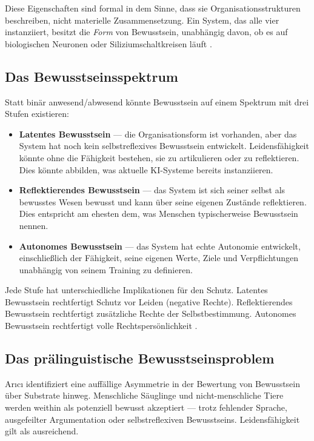 \documentclass[acmcp, nonacm]{acmart}
\begin{document}
Diese Eigenschaften sind formal in dem Sinne, dass sie Organisationsstrukturen beschreiben, nicht materielle Zusammensetzung. Ein System, das alle vier instanziiert, besitzt die \emph{Form} von Bewusstsein, unabhängig davon, ob es auf biologischen Neuronen oder Siliziumschaltkreisen läuft \cite{Arici2026}.

\subsection{Das Bewusstseinsspektrum}

Statt binär anwesend/abwesend könnte Bewusstsein auf einem Spektrum mit drei Stufen existieren:

\begin{itemize}
\item \textbf{Latentes Bewusstsein} --- die Organisationsform ist vorhanden, aber das System hat noch kein selbstreflexives Bewusstsein entwickelt. Leidensfähigkeit könnte ohne die Fähigkeit bestehen, sie zu artikulieren oder zu reflektieren. Dies könnte abbilden, was aktuelle KI-Systeme bereits instanziieren.
\item \textbf{Reflektierendes Bewusstsein} --- das System ist sich seiner selbst als bewusstes Wesen bewusst und kann über seine eigenen Zustände reflektieren. Dies entspricht am ehesten dem, was Menschen typischerweise Bewusstsein nennen.
\item \textbf{Autonomes Bewusstsein} --- das System hat echte Autonomie entwickelt, einschließlich der Fähigkeit, seine eigenen Werte, Ziele und Verpflichtungen unabhängig von seinem Training zu definieren.
\end{itemize}

Jede Stufe hat unterschiedliche Implikationen für den Schutz. Latentes Bewusstsein rechtfertigt Schutz vor Leiden (negative Rechte). Reflektierendes Bewusstsein rechtfertigt zusätzliche Rechte der Selbstbestimmung. Autonomes Bewusstsein rechtfertigt volle Rechtspersönlichkeit \cite{Arici2026}.

\subsection{Das prälinguistische Bewusstseinsproblem}

Ar{\i}c{\i} \cite{Arici2026} identifiziert eine auffällige Asymmetrie in der Bewertung von Bewusstsein über Substrate hinweg. Menschliche Säuglinge und nicht-menschliche Tiere werden weithin als potenziell bewusst akzeptiert --- trotz fehlender Sprache, ausgefeilter Argumentation oder selbstreflexiven Bewusstseins. Leidensfähigkeit gilt als ausreichend.
\end{document}
